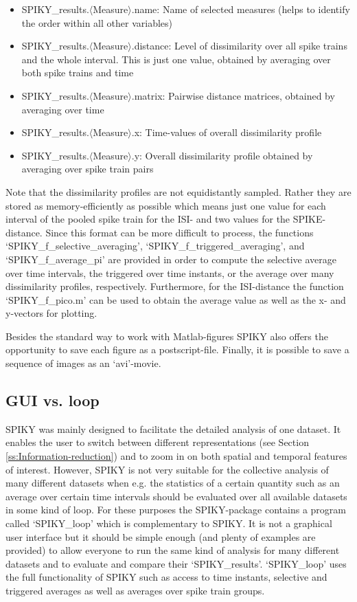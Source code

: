 \documentclass[10pt,twocolumn]{elsart5p}
\begin{document}
\begin{itemize}
\item SPIKY\_results.$\langle$Measure$\rangle$.name: Name of selected measures (helps to identify the order within all other variables)
\item SPIKY\_results.$\langle$Measure$\rangle$.distance: Level of dissimilarity over all spike trains and the whole interval. This is just one value, obtained by averaging over both spike trains and time
\item SPIKY\_results.$\langle$Measure$\rangle$.matrix: Pairwise distance matrices, obtained by averaging over time
\item SPIKY\_results.$\langle$Measure$\rangle$.x: Time-values of overall dissimilarity profile
\item SPIKY\_results.$\langle$Measure$\rangle$.y: Overall dissimilarity profile obtained by averaging over spike train pairs
\end{itemize}

Note that the dissimilarity profiles are not equidistantly sampled. Rather they are stored as memory-efficiently as possible which means just one value for each interval of the pooled spike train for the ISI- and two values for the SPIKE-distance. Since this format can be more difficult to process, the functions `SPIKY\_f\_selective\_averaging', `SPIKY\_f\_triggered\_averaging', and `SPIKY\_f\_average\_pi' are provided in order to compute the selective average over time intervals, the triggered over time instants, or the average over many dissimilarity profiles, respectively. Furthermore, for the ISI-distance the function `SPIKY\_f\_pico.m' can be used to obtain the average value as well as the x- and y-vectors for plotting.

Besides the standard way to work with Matlab-figures SPIKY also offers the opportunity to save each figure as a postscript-file. Finally, it is possible to save a sequence of images as an `avi'-movie.


\subsection{\label{ss:GUI-vs-loop} GUI vs. loop}

SPIKY was mainly designed to facilitate the detailed analysis of one dataset. It enables the user to switch between different representations (see Section \ref{ss:Information-reduction}) and to zoom in on both spatial and temporal features of interest. However, SPIKY is not very suitable for the collective analysis of many different datasets when e.g. the statistics of a certain quantity such as an average over certain time intervals should be evaluated over all available datasets in some kind of loop. For these purposes the SPIKY-package contains a program called `SPIKY\_loop' which is complementary to SPIKY. It is not a graphical user interface but it should be simple enough (and plenty of examples are provided) to allow everyone to run the same kind of analysis for many different datasets and to evaluate and compare their `SPIKY\_results'. `SPIKY\_loop' uses the full functionality of SPIKY such as access to time instants, selective and triggered averages as well as averages over spike train groups.
\end{document}
